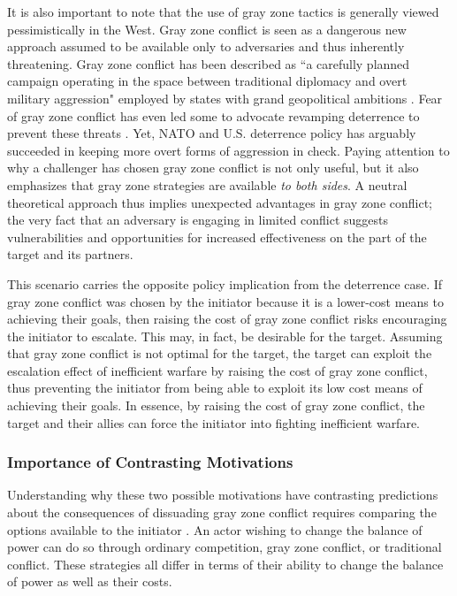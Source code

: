 \documentclass[12pt,letterpaper]{article}
\begin{document}
			It is also important to note that the use of gray zone tactics is generally viewed pessimistically in the West. Gray zone conflict is seen as a dangerous new approach assumed to be available only to adversaries and thus inherently threatening. Gray zone conflict has been described as ``a carefully planned campaign operating in the space between traditional diplomacy and overt military aggression" employed by states with grand geopolitical ambitions \citep{mazarr_masteringgrayzone_2015}. Fear of gray zone conflict has even led some to advocate revamping deterrence to prevent these threats \citep{santoro_healeywrongit_2016, foust_canfancybear_2016, jackson_preventingnuclearwar_2016}. Yet, NATO and U.S. deterrence policy has arguably succeeded in keeping more overt forms of aggression in check. Paying attention to why a challenger has chosen gray zone conflict is not only useful, but it also emphasizes that gray zone strategies are available \textit{to both sides}. A neutral theoretical approach thus implies unexpected advantages in gray zone conflict; the very fact that an adversary is engaging in limited conflict suggests vulnerabilities and opportunities for increased effectiveness on the part of the target and its partners.
	
			This scenario carries the opposite policy implication from the deterrence case. If gray zone conflict was chosen by the initiator because it is a lower-cost means to achieving their goals, then raising the cost of gray zone conflict risks encouraging the initiator to escalate. This may, in fact, be desirable for the target. Assuming that gray zone conflict is not optimal for the target, the target can exploit the escalation effect of inefficient warfare by raising the cost of gray zone conflict, thus preventing the initiator from being able to exploit its low cost means of achieving their goals. In essence, by raising the cost of gray zone conflict, the target and their allies can force the initiator into fighting inefficient warfare.
	
		\subsubsection{Importance of Contrasting Motivations}	
			Understanding why these two possible motivations have contrasting predictions about the consequences of dissuading gray zone conflict requires comparing the options available to the initiator \citep{schram_hassling_2017}. An actor wishing to change the balance of power can do so through ordinary competition, gray zone conflict, or traditional conflict. These strategies all differ in terms of their ability to change the balance of power as well as their costs.
		
\end{document}
